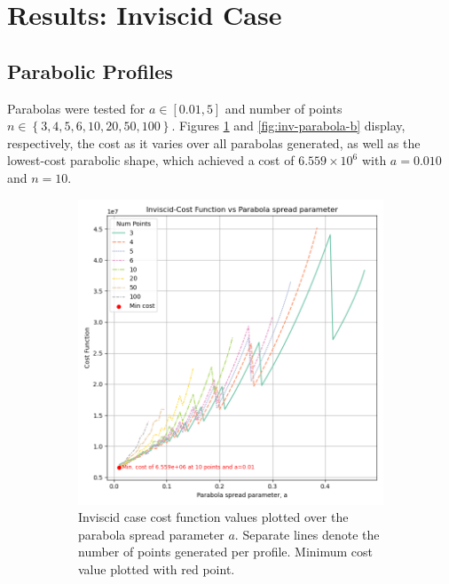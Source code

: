 \documentclass[11pt]{article}
\begin{document}
\section{Results: Inviscid Case} \label{inviscid_results}
\subsection{Parabolic Profiles}
Parabolas were tested for $a \in [0.01, 5]$ and number of points $n \in \left\{3, 4, 5, 6, 10, 20, 50, 100 \right\}$. Figures \ref{fig:inv-parabola-a} and \ref{fig:inv-parabola-b} display, respectively, the cost as it varies over all parabolas generated, as well as the lowest-cost parabolic shape, which achieved a cost of $6.559 \times 10^6$ with $a=0.010$ and $n=10$.
\begin{figure}[H]
\centering
\begin{subfigure}[b]{0.45\textwidth}
    \centering
    \includegraphics[width=\linewidth]{../results/inviscid/parabolas.png}
    \caption{Inviscid case cost function values plotted over the parabola spread parameter $a$. Separate lines denote the number of points generated per profile. Minimum cost value plotted with red point.}
    \label{fig:inv-parabola-a}
\end{subfigure}
\hfill
\begin{subfigure}[b]{0.45\textwidth}

\end{subfigure}
\end{figure}
\end{document}
